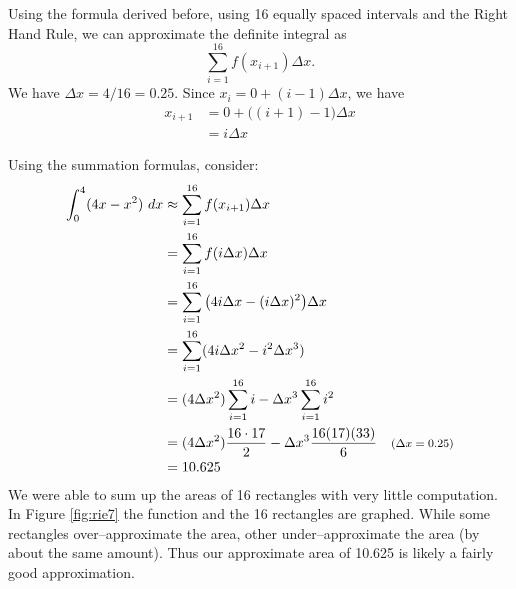 {Using the formula derived before, using 16 equally spaced intervals and the Right Hand Rule, we can approximate the definite integral as $$\sum_{i=1}^{16}f(x_{i+1})\Delta x.$$
We have $\Delta x = 4/16 = 0.25$. Since $x_i = 0+(i-1)\Delta x$, we have 
\begin{align*}
x_{i+1} &= 0 + \big((i+1)-1\big)\Delta x \\
				&=	i\Delta x
\end{align*}

Using the summation formulas, consider:
\begin{align}
\int_0^4 (4x-x^2)\ dx &\approx \sum_{i=1}^{16} f(x_{i+1})\Delta x \notag\\
											&= \sum_{i=1}^{16} f(i\Delta x) \Delta x\notag\\
									&= \sum_{i=1}^{16} \big(4i\Delta x - (i\Delta x)^2\big)\Delta x\notag\\
									&= \sum_{i=1}^{16} (4i\Delta x^2 - i^2\Delta x^3)\notag\\		
									&= (4\Delta x^2)\sum_{i=1}^{16} i - \Delta x^3 \sum_{i=1}^{16} i^2 \label{eq:rie7}\\
									&= (4\Delta x^2)\frac{16\cdot 17}{2} - \Delta x^3 \frac{16(17)(33)}6 \quad \text{\footnotesize $(\Delta x = 0.25)$}\notag\\
									&=10.625\notag
\end{align}
We were able to sum up the areas of 16 rectangles with very little computation. In Figure \ref{fig:rie7} the function and the 16 rectangles are graphed. While some rectangles over--approximate the area, other under--approximate the area (by about the same amount). Thus our approximate area of 10.625 is likely a fairly good approximation.
\enlargethispage{3\baselineskip} 

}

